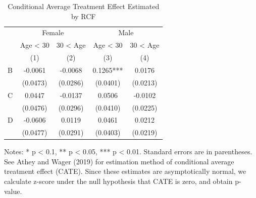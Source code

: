 \documentclass[
]{article}
\begin{document}
\begin{table}[H]

\caption{\label{tab:rcf-int-cate}Conditional Average Treatment Effect Estimated by RCF}
\centering
\fontsize{9}{11}\selectfont
\begin{threeparttable}
\begin{tabular}[t]{lcccc}
\toprule
\multicolumn{1}{c}{ } & \multicolumn{2}{c}{Female} & \multicolumn{2}{c}{Male} \\
\cmidrule(l{3pt}r{3pt}){2-3} \cmidrule(l{3pt}r{3pt}){4-5}
\multicolumn{1}{c}{ } & \multicolumn{1}{c}{Age < 30} & \multicolumn{1}{c}{30 < Age} & \multicolumn{1}{c}{Age < 30} & \multicolumn{1}{c}{30 < Age} \\
\cmidrule(l{3pt}r{3pt}){2-2} \cmidrule(l{3pt}r{3pt}){3-3} \cmidrule(l{3pt}r{3pt}){4-4} \cmidrule(l{3pt}r{3pt}){5-5}
 & (1) & (2) & (3) & (4)\\
\midrule
B & -0.0061 & -0.0068 & 0.1265*** & 0.0176\\
 & (0.0473) & (0.0286) & (0.0401) & (0.0213)\\
C & 0.0447 & -0.0137 & 0.0506 & -0.0102\\
 & (0.0476) & (0.0296) & (0.0410) & (0.0225)\\
D & -0.0606 & 0.0119 & 0.0461 & 0.0212\\
 & (0.0477) & (0.0291) & (0.0403) & (0.0219)\\
\bottomrule
\end{tabular}
\begin{tablenotes}
\item Notes: * p < 0.1, ** p < 0.05, *** p < 0.01. Standard errors are in parentheses. See Athey and Wager (2019) for estimation method of conditional average treatment effect (CATE). Since these estimates are asymptotically normal, we calculate z-score under the null hypothesis that CATE is zero, and obtain p-value. 
\end{tablenotes}
\end{threeparttable}
\end{table}
\end{document}
